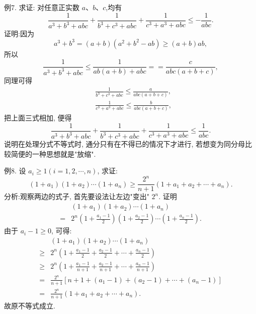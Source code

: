 例7. 求证: 对任意正实数 $a 、 b 、 c$,均有
$$
\frac{1}{a^3+b^3+a b c}+\frac{1}{b^3+c^3+a b c}+\frac{1}{c^3+a^3+a b c} \leqslant-\frac{1}{a b c} .
$$
证明:因为
$$
a^3+b^3=(a+b)\left(a^2+b^2-a b\right) \geqslant(a+b) a b,
$$
所以
$$
\frac{1}{a^3+b^3+a b c} \leqslant \frac{1}{a b(a+b)+a b c}==\frac{c}{a b c(a+b+c)},
$$
同理可得
$$
\begin{aligned}
& \frac{1}{b^3+c^3+a b c} \leqslant \frac{a}{a b c(a+b+c)}, \\
& \frac{1}{c^3+a^3+a b c} \leqslant \frac{b}{a b c(a+b+c)},
\end{aligned}
$$
把上面三式相加, 便得
$$
\frac{1}{a^3+b^3+a b c}+\frac{1}{b^3+c^3+a b c}+\frac{1}{c^3+a^3+a b c} \leqslant \frac{1}{a b c} .
$$
说明在处理分式不等式时, 通分只有在不得已的情况下才进行, 若想变为同分母比较简便的一种思想就是"放缩".



例8. 设 $a_i \geqslant 1(i=1,2, \cdots, n)$, 求证:
$$
\left(1+a_1\right)\left(1+a_2\right) \cdots\left(1+a_n\right) \geqslant \frac{2^n}{n+1}\left(1+a_1+a_2+\cdots+a_n\right) .
$$
分析:观察两边的式子, 首先要设法让左边"变出" $2^n$.
证明
$$
\begin{aligned}
& \left(1+a_1\right)\left(1+a_2\right) \cdots\left(1+a_n\right) \\
= & 2^n\left(1+\frac{a_1-1}{2}\right)\left(1+\frac{a_2-1}{2}\right) \cdots\left(1+\frac{a_n-1}{2}\right) .
\end{aligned}
$$
由于 $a_i-1 \geqslant 0$, 可得:
$$
\begin{aligned}
& \left(1+a_1\right)\left(1+a_2\right) \cdots\left(1+a_n\right) \\
\geqslant & 2^n\left(1+\frac{a_1-1}{2}+\frac{a_2-1}{2}+\cdots+\frac{a_n-1}{2}\right) \\
\geqslant & 2^n\left(1+\frac{a_1-1}{n+1}+\frac{a_2-1}{n+1}+\cdots+\frac{a_n-1}{n+1}\right) \\
= & \frac{2^n}{n+1}\left[n+1+\left(a_1-1\right)+\left(a_2-1\right)+\cdots+\left(a_n-1\right)\right] \\
= & \frac{2^n}{n+1}\left(1+a_1+a_2+\cdots+a_n\right) .
\end{aligned}
$$
故原不等式成立.



